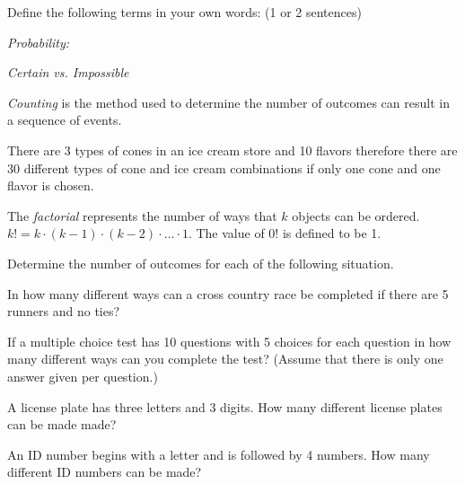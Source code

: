 \begin{problem}
  \item Define the following terms in your own words: (1 or 2 sentences) 

    \begin{subproblem}
      \item \textit{Probability:}

        \vfill

      \item \textit{Certain vs. Impossible}

        \vfill

    \end{subproblem}


    \begin{definition}
      \textit{Counting} is the method used to determine the number of
      outcomes can result in a sequence of events.  
    \end{definition}

    \begin{example}
      There are 3 types of cones in an ice cream store and 10 flavors
      therefore there are 30 different types of cone and ice cream
      combinations if only one cone and one flavor is chosen.
    \end{example}

    \begin{definition}
      The \textit{factorial} represents the number of ways that $k$
       objects can be ordered. $k! = k \cdot (k-1) \cdot (k-2) \cdot
       \ldots \cdot 1$.  The value of  0! is defined to be 1.
    \end{definition}


        \clearpage

    \item Determine the number of outcomes for each of the following
      situation.

      \begin{subproblem}
      \item In how many different ways can a cross country race be
        completed if there are 5 runners and no ties?

        \vfill

      \item If a multiple choice test has 10 questions with 5 choices
        for each question in how many different ways can you complete
        the test? (Assume that there is only one answer given per
        question.)

        \vfill

      \item A license plate has three letters and 3 digits. How many
        different license plates can be made made?

        \vfill

      \item An ID number begins with a letter and is followed by 4
        numbers. How many different ID numbers can be made?

        \vfill

  \end{subproblem}


\end{problem}
